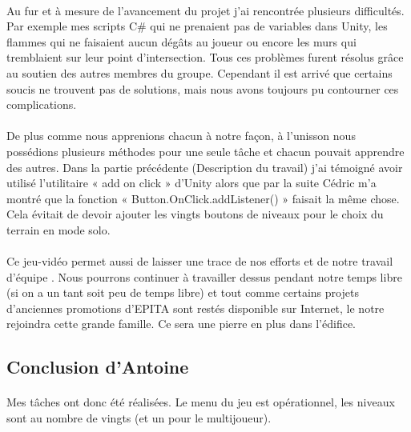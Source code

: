 \documentclass[titlepage, 13px, a4paper]{report}
\begin{document}
\paragraph{} \hspace{0pt}
Au fur et à mesure de l'avancement du projet j'ai rencontrée plusieurs difficultés.
Par exemple mes scripts C\# qui ne prenaient pas de variables dans Unity, les
flammes qui ne faisaient aucun dégâts au joueur ou encore les murs qui
tremblaient sur leur point d'intersection. Tous ces problèmes furent résolus grâce
au soutien des autres membres du groupe. Cependant il est arrivé que certains
soucis ne trouvent pas de solutions, mais nous avons toujours pu contourner ces
complications. \\


\paragraph{} \hspace{0pt} 
De plus comme nous apprenions chacun à notre façon, à l’unisson nous
possédions plusieurs méthodes pour une seule tâche et chacun pouvait apprendre
des autres. Dans la partie précédente (Description du travail) j'ai témoigné avoir
utilisé l'utilitaire « add on click » d'Unity alors que par la suite Cédric m'a montré
que la fonction « Button.OnClick.addListener() » faisait la même chose. Cela évitait de devoir
ajouter les vingts boutons de niveaux pour le choix du terrain en mode solo. \\


\paragraph{} \hspace{0pt} 
Ce jeu-vidéo permet aussi de laisser une trace de nos efforts et de notre travail
d'équipe . Nous pourrons continuer à travailler dessus pendant notre temps libre
(si on a un tant soit peu de temps libre) et tout comme certains projets d'anciennes
promotions d'EPITA sont restés disponible sur Internet, le notre rejoindra cette
grande famille. Ce sera une pierre en plus dans l'édifice. \\


\subsection{Conclusion d'Antoine}
\paragraph{} \hspace{0pt}
Mes tâches ont donc été réalisées. Le menu du jeu est opérationnel, les niveaux
sont au nombre de vingts (et un pour le multijoueur). \\
\end{document}
